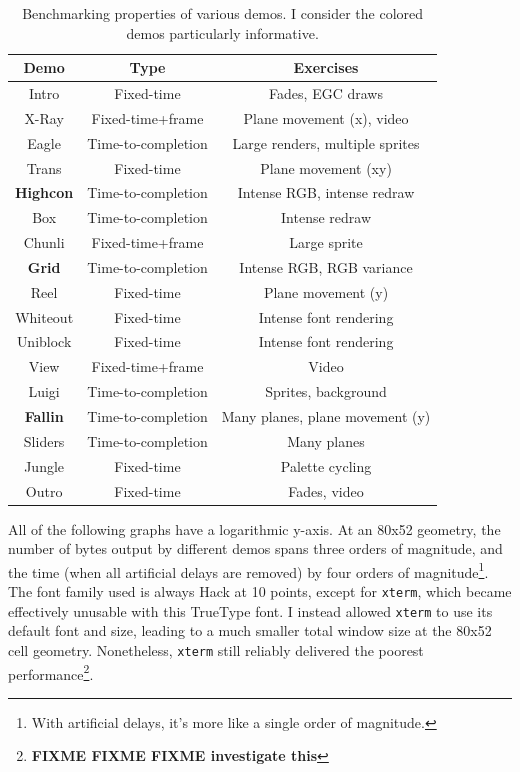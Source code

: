 \begin{table}[!htbp]
  \centering
  \begin{tabular}{ |c|c|c| }
    \hline
    Demo & Type & Exercises \\
    \hline
    \hline
    Intro & Fixed-time & Fades, EGC draws \\
    \hline
    X-Ray & Fixed-time+frame & Plane movement (x), video \\
    \hline
    Eagle & Time-to-completion & Large renders, multiple sprites \\
    \hline
    Trans & Fixed-time & Plane movement (xy) \\
    \hline
    \rowcolor{blue!25}
    \textbf{Highcon} & Time-to-completion & Intense RGB, intense redraw \\
    \hline
    Box & Time-to-completion & Intense redraw \\
    \hline
    Chunli & Fixed-time+frame & Large sprite \\
    \hline
    \rowcolor{blue!25}
    \textbf{Grid} & Time-to-completion & Intense RGB, RGB variance \\
    \hline
    Reel & Fixed-time & Plane movement (y) \\
    \hline
    Whiteout & Fixed-time & Intense font rendering \\
    \hline
    Uniblock & Fixed-time & Intense font rendering \\
    \hline
    View & Fixed-time+frame & Video \\
    \hline
    Luigi & Time-to-completion & Sprites, background \\
    \hline
    \rowcolor{blue!25}
    \textbf{Fallin} & Time-to-completion & Many planes, plane movement (y) \\
    \hline
    Sliders & Time-to-completion & Many planes \\
    \hline
    Jungle & Fixed-time & Palette cycling \\
    \hline
    Outro & Fixed-time & Fades, video \\
    \hline
  \end{tabular}
\caption[Benchmarking properties of various demos.]{Benchmarking properties of
  various demos. I consider the colored demos particularly informative.}
\label{table:benchmarks}
\end{table}

All of the following graphs have a logarithmic y-axis. At an 80x52 geometry,
the number of bytes output by different demos spans three orders of magnitude,
and the time (when all artificial delays are removed) by four orders of
magnitude\footnote{With artificial delays, it's more like a single order of
magnitude.}. The font family used is always Hack\cite{hacktypeface} at 10 points,
except for \texttt{xterm}, which became effectively unusable with this TrueType
font. I instead allowed \texttt{xterm} to use its default font and size, leading
to a much smaller total window size at the 80x52 cell geometry. Nonetheless,
\texttt{xterm} still reliably delivered the poorest performance\footnote{\textbf{FIXME FIXME FIXME investigate this}}.

